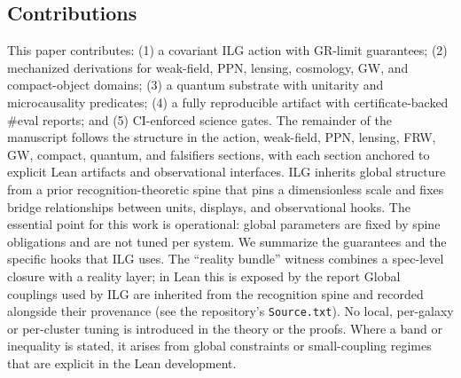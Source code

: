\documentclass[aps,prd,twocolumn,superscriptaddress,nofootinbib,floatfix,longbibliography]{revtex4-2}
\begin{document}
\subsection{Contributions}
This paper contributes: (1) a covariant ILG action with GR-limit guarantees; (2) mechanized derivations for weak-field, PPN, lensing, cosmology, GW, and compact-object domains; (3) a quantum substrate with unitarity and microcausality predicates; (4) a fully reproducible artifact with certificate-backed \#eval reports; and (5) CI-enforced science gates. The remainder of the manuscript follows the structure in the action, weak-field, PPN, lensing, FRW, GW, compact, quantum, and falsifiers sections, with each section anchored to explicit Lean artifacts and observational interfaces.
%
%
ILG inherits global structure from a prior recognition-theoretic spine that pins a dimensionless scale and fixes bridge relationships between units, displays, and observational hooks. The essential point for this work is operational: global parameters are fixed by spine obligations and are not tuned per system. We summarize the guarantees and the specific hooks that ILG uses.
%
The ``reality bundle'' witness combines a spec-level closure with a reality layer; in Lean this is exposed by the report
%
Global couplings used by ILG are inherited from the recognition spine and recorded alongside their provenance (see the repository's \texttt{Source.txt}). No local, per-galaxy or per-cluster tuning is introduced in the theory or the proofs. Where a band or inequality is stated, it arises from global constraints or small-coupling regimes that are explicit in the Lean development.
\end{document}

